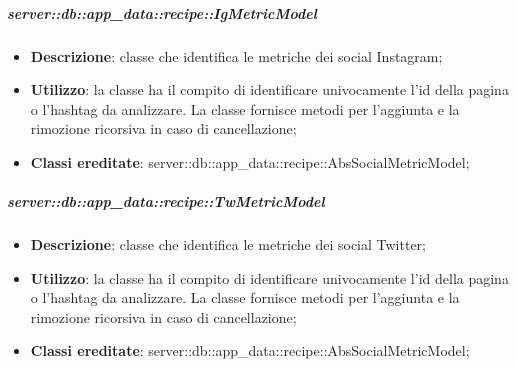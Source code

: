 		\subparagraph{server::db::app\_data::recipe::IgMetricModel} %
		\label{subp:server_db_app_data_recipe_igmetricmodel}
			\begin{itemize}
				\item \textbf{Descrizione}: classe che identifica le metriche dei social Instagram;
				\item \textbf{Utilizzo}: la classe ha il compito di identificare univocamente l'id della pagina o l'hashtag da analizzare. La classe fornisce metodi per l'aggiunta e la rimozione ricorsiva in caso di cancellazione;
				\item \textbf{Classi ereditate}: server::db::app\_data::recipe::AbsSocialMetricModel;
			\end{itemize}


		\subparagraph{server::db::app\_data::recipe::TwMetricModel} %
		\label{subp:server_db_app_data_recipe_twmetricmodel}
			\begin{itemize}
				\item \textbf{Descrizione}: classe che identifica le metriche dei social Twitter;
				\item \textbf{Utilizzo}: la classe ha il compito di identificare univocamente l'id della pagina o l'hashtag da analizzare. La classe fornisce metodi per l'aggiunta e la rimozione ricorsiva in caso di cancellazione;
				\item \textbf{Classi ereditate}: server::db::app\_data::recipe::AbsSocialMetricModel;
			\end{itemize}
